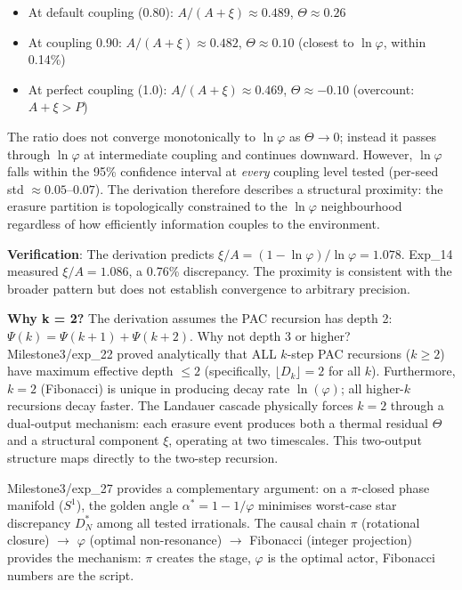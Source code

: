 \documentclass[
  11pt,
  a4paper]{article}
\providecommand{\tightlist}{%
  \setlength{\itemsep}{0pt}\setlength{\parskip}{0pt}}
\begin{document}
\begin{itemize}
\tightlist
\item
  At default coupling (0.80): \(A/(A+\xi) \approx 0.489\),
  \(\Theta \approx 0.26\)
\item
  At coupling 0.90: \(A/(A+\xi) \approx 0.482\), \(\Theta \approx 0.10\)
  (closest to \(\ln\varphi\), within 0.14\%)
\item
  At perfect coupling (1.0): \(A/(A+\xi) \approx 0.469\),
  \(\Theta \approx -0.10\) (overcount: \(A+\xi > P\))
\end{itemize}

The ratio does not converge monotonically to \(\ln\varphi\) as
\(\Theta \to 0\); instead it passes through \(\ln\varphi\) at
intermediate coupling and continues downward. However, \(\ln\varphi\)
falls within the 95\% confidence interval at \emph{every} coupling level
tested (per-seed std \(\approx 0.05\)--\(0.07\)). The derivation
therefore describes a structural proximity: the erasure partition is
topologically constrained to the \(\ln\varphi\) neighbourhood regardless
of how efficiently information couples to the environment.

\textbf{Verification}: The derivation predicts
\(\xi/A = (1 - \ln\varphi)/\ln\varphi = 1.078\). Exp\_14 measured
\(\xi/A = 1.086\), a 0.76\% discrepancy. The proximity is consistent
with the broader pattern but does not establish convergence to arbitrary
precision.

\textbf{Why k = 2?} The derivation assumes the PAC recursion has depth
2: \(\Psi(k) = \Psi(k+1) + \Psi(k+2)\). Why not depth 3 or higher?
Milestone3/exp\_22 proved analytically that ALL \(k\)-step PAC
recursions (\(k \geq 2\)) have maximum effective depth \(\leq 2\)
(specifically, \(\lfloor D_k \rfloor = 2\) for all \(k\)). Furthermore,
\(k = 2\) (Fibonacci) is unique in producing decay rate
\(\ln(\varphi)\); all higher-\(k\) recursions decay faster. The Landauer
cascade physically forces \(k = 2\) through a dual-output mechanism:
each erasure event produces both a thermal residual \(\Theta\) and a
structural component \(\xi\), operating at two timescales. This
two-output structure maps directly to the two-step recursion.

Milestone3/exp\_27 provides a complementary argument: on a
\(\pi\)-closed phase manifold (\(S^1\)), the golden angle
\(\alpha^* = 1 - 1/\varphi\) minimises worst-case star discrepancy
\(D^*_N\) among all tested irrationals. The causal chain \(\pi\)
(rotational closure) \(\to\) \(\varphi\) (optimal non-resonance) \(\to\)
Fibonacci (integer projection) provides the mechanism: \(\pi\) creates
the stage, \(\varphi\) is the optimal actor, Fibonacci numbers are the
script.
\end{document}
